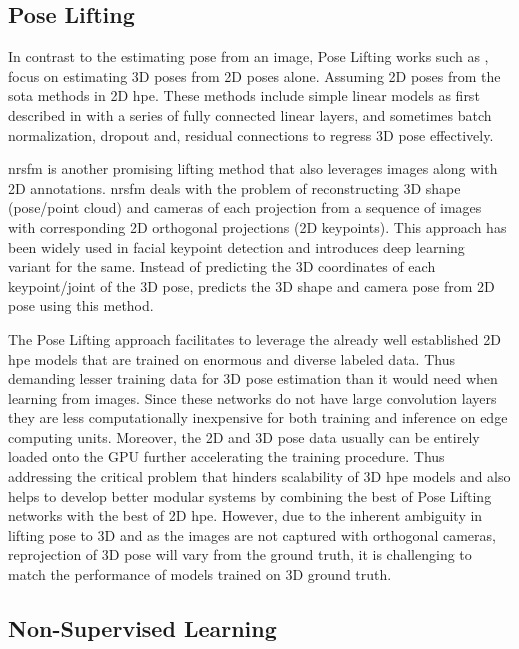 \subsection{Pose Lifting}

In contrast to the estimating pose from an image, Pose Lifting works such as \cite{poselifter,  amazon1, repnet, c3dpo, unsupervisedAdversarial}, focus on estimating 3D poses from 2D poses alone. Assuming 2D poses from the \ac{sota} methods in 2D \ac{hpe}. These methods include simple linear models as first described in \cite{MartinezHRL17} with a series of fully connected linear layers, and sometimes batch normalization, dropout and, residual connections to regress 3D pose effectively.

\ac{nrsfm} is another promising lifting method that also leverages images along with 2D annotations. \ac{nrsfm} deals with the problem of reconstructing 3D shape (pose/point cloud) and cameras of each projection from a sequence of images with corresponding 2D orthogonal projections (2D keypoints). This approach has been widely used in facial keypoint detection and \cite{deepNRSFM} introduces deep learning variant for the same. Instead of predicting the 3D coordinates of each keypoint/joint of the 3D pose, \cite{DistillNRSfM, c3dpo, deepNRSFM, nrsfm++} predicts the 3D shape and camera pose from 2D pose using this method.

The Pose Lifting approach facilitates to leverage the already well established 2D \ac{hpe} models that are trained on enormous and diverse labeled data. Thus demanding lesser training data for 3D pose estimation than it would need when learning from images. Since these networks do not have large convolution layers they are less computationally inexpensive for both training and inference on edge computing units. Moreover, the 2D and 3D pose data usually can be entirely loaded onto the GPU further accelerating the training procedure. Thus addressing the critical problem that hinders scalability of 3D \ac{hpe} models and also helps to develop better modular systems by combining the best of Pose Lifting networks with the best of 2D \ac{hpe}. However, due to the inherent ambiguity in lifting pose to 3D and as the images are not captured with orthogonal cameras, reprojection of 3D pose will vary from the ground truth, it is challenging to match the performance of models trained on 3D ground truth.

\subsection{Non-Supervised Learning}

